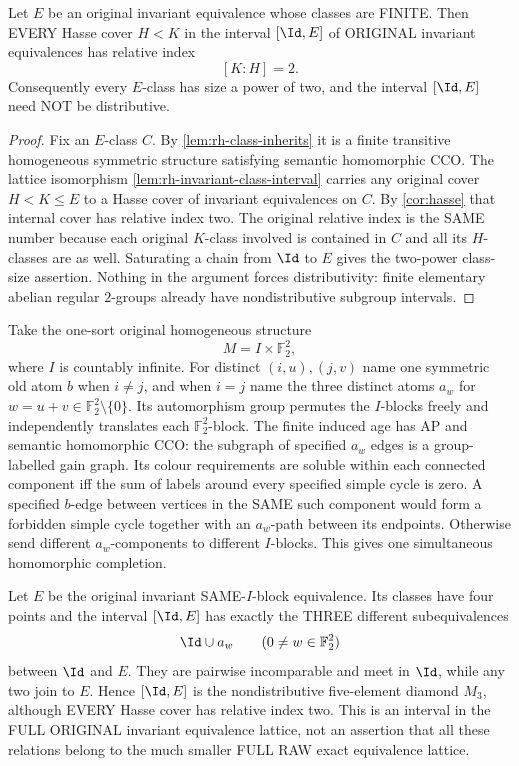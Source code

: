 \begin{corollary}
\label{cor:rh-finite-invariant-interval-index-two}
Let $E$ be an original
invariant equivalence
whose classes are FINITE.
Then EVERY Hasse cover
$H<K$ in the interval
$[\Id,E]$ of ORIGINAL
invariant equivalences
has relative index
\[
                          [K:H]=2 .
\]
Consequently every
$E$-class has size a
power of two, and the
interval $[\Id,E]$
need NOT be
distributive.
\end{corollary}
\begin{proof}
Fix an $E$-class $C$.
By \cref{lem:rh-class-inherits}
it is a finite transitive
homogeneous symmetric
structure satisfying
semantic homomorphic CCO.
The lattice isomorphism
\cref{lem:rh-invariant-class-interval}
carries any original cover
$H<K\le E$ to a Hasse cover
of invariant equivalences
on $C$. By
\cref{cor:hasse} that
internal cover has
relative index two.
The original relative
index is the SAME number
because each original
$K$-class involved is
contained in $C$ and
all its $H$-classes are
as well. Saturating a
chain from $\Id$ to $E$
gives the two-power
class-size assertion.
Nothing in the
argument forces
distributivity: finite
elementary abelian
regular $2$-groups
already have
nondistributive
subgroup intervals.
\end{proof}

\begin{example}
\label{ex:rh-finite-invariant-M3}
Take the one-sort original
homogeneous structure
\[
          M=I\times\mathbb F_2^2,
\]
where $I$ is countably
infinite. For distinct
$(i,u),(j,v)$ name one
symmetric old atom $b$
when $i\ne j$, and
when $i=j$ name the
three distinct atoms
$a_w$ for
$w=u+v\in\mathbb F_2^2
                  \setminus\{0\}$.
Its automorphism group
permutes the $I$-blocks
freely and independently
translates each
$\mathbb F_2^2$-block.
The finite induced age
has AP and semantic
homomorphic CCO:
the subgraph of specified
$a_w$ edges is a
group-labelled gain graph.
Its colour requirements
are soluble within each
connected component iff
the sum of labels around
every specified simple
cycle is zero.
A specified $b$-edge
between vertices in the
SAME such component
would form a forbidden
simple cycle together with
an $a_w$-path between
its endpoints.
Otherwise send different
$a_w$-components to
different $I$-blocks.
This gives one simultaneous
homomorphic completion.

Let $E$ be the original
invariant SAME-$I$-block
equivalence. Its classes
have four points and
the interval $[\Id,E]$
has exactly the THREE
different subequivalences
\[
        \Id\cup a_w
           \qquad
       (0\ne w\in\mathbb F_2^2)
\]
between $\Id$ and $E$.
They are pairwise
incomparable and meet
in $\Id$, while any two
join to $E$. Hence
$[\Id,E]$ is the
nondistributive
five-element diamond
$M_3$, although EVERY
Hasse cover has relative
index two. This is an
interval in the FULL
ORIGINAL invariant
equivalence lattice,
not an assertion that
all these relations
belong to the much
smaller FULL RAW exact
equivalence lattice.
\end{example}


